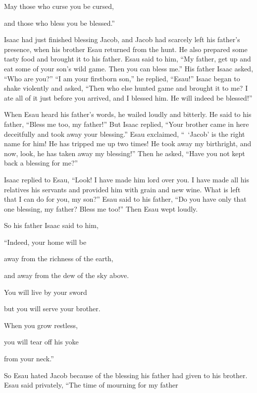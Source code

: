 {\par }{\Q May those who curse
you be cursed,
\par }{\Q and those who bless
you be blessed.”
\par }{\PP {}Isaac
had just
finished
blessing
Jacob,
and Jacob
had scarcely left
his
father’s
presence,
when his brother
Esau
returned
from the hunt.
He also
prepared
some tasty food
and brought
it to his
father.
Esau said
to him, “My father,
get up
and eat
some of your son’s
wild game.
Then you can bless me.”
His father
Isaac
asked, “Who
are you?” “I am
your firstborn
son,”
he replied,
“Esau!”
Isaac
began to shake
violently
and asked,
“Then who
else
hunted
game
and brought
it to me? I ate
all
of it just before
you arrived,
and I blessed
him. He will
indeed
be
blessed!”
\par }{\PP {}When Esau
heard
his father’s
words,
he wailed
loudly
and bitterly.
He said
to his father,
“Bless
me too,
my
father!”
But Isaac replied,
“Your brother
came
in here deceitfully
and took
away your blessing.”
Esau exclaimed,
“ ‘Jacob’
is the right name
for
him! He has tripped
me up
two times! He took away
my birthright,
and now,
look,
he has taken away
my blessing!” Then he asked,
“Have you not
kept back
a blessing for me?”
\par }{\PP {}Isaac
replied
to Esau,
“Look! I have made him lord
over you. I have made
all
his relatives
his servants
and provided
him with grain
and new wine.
What
is left that I can do
for you, my son?”
Esau
said
to
his
father,
“Do you have only that one
blessing,
my father? Bless
me
too!” Then Esau
wept
loudly.
\par }{\PP {}So
his father
Isaac
said
to him,
\par }{\Q “Indeed,
your home will be
\par }{\Q away from the richness
of the earth,
\par }{\Q and away from the dew
of the sky
above.
\par }{\Q {}You will live
by your sword
\par }{\Q but you will serve
your brother.
\par }{\Q When
you grow restless,
\par }{\Q you will tear off
his yoke
\par }{\Q from your neck.”
\par }{\PP {}So Esau
hated
Jacob
because
of the blessing
his father
had
given to his brother. Esau
said
privately, “The time
of mourning
for my father
}
